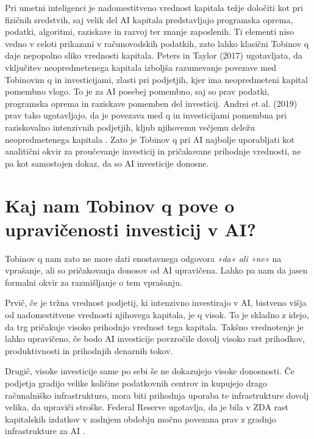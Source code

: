 \documentclass[12pt,a4paper]{article}
\begin{document}
Pri umetni inteligenci je nadomestitveno vrednost kapitala težje določiti kot pri fizičnih 
sredstvih, saj velik del AI kapitala predstavljajo programska oprema, podatki, algoritmi, 
raziskave in razvoj ter znanje zaposlenih. Ti elementi niso vedno v celoti prikazani v računovodskih 
podatkih, zato lahko klasični Tobinov q daje nepopolno sliko vrednosti kapitala.
Peters in Taylor (2017) ugotavljata, da vključitev neopredmetenega kapitala izboljša \citep{PetersTaylor2016} 
razumevanje povezave med Tobinovim q in investicijami, zlasti pri podjetjih, kjer ima 
neopredmeteni kapital pomembno vlogo. To je za AI posebej pomembno, saj so prav podatki, 
programska oprema in raziskave pomemben del investicij. Andrei et al. (2019) prav tako 
ugotavljajo, da je povezava med q in investicijami pomembna pri raziskovalno intenzivnih 
podjetjih, kljub njihovemu večjemu deležu neopredmetenega kapitala \citep{AndreiMannMoyen2017}.
Zato je Tobinov q pri AI najbolje uporabljati kot analitični okvir za proučevanje 
investicij in pričakovane prihodnje vrednosti, ne pa kot samostojen dokaz, da so AI 
investicije donosne.




\section{Kaj nam Tobinov q pove o upravičenosti investicij v AI?}




Tobinov q nam zato ne more dati enostavnega odgovora \textit{»da« ali »ne«} na vprašanje, 
ali so pričakovanja donosov od AI upravičena. Lahko pa nam da jasen formalni okvir za 
razmišljanje o tem vprašanju.

Prvič, če je tržna vrednost podjetij, ki intenzivno investirajo v AI, bistveno višja od 
nadomestitvene vrednosti njihovega kapitala, je q visok. To je skladno z idejo, da trg 
pričakuje visoko prihodnjo vrednost tega kapitala. Takšno vrednotenje je lahko upravičeno, 
če bodo AI investicije povzročile dovolj visoko rast prihodkov, produktivnosti in prihodnjih 
denarnih tokov.

Drugič, visoke investicije same po sebi še ne dokazujejo visoke donosnosti. Če podjetja 
gradijo velike količine podatkovnih centrov in kupujejo drago računalniško infrastrukturo, 
mora biti prihodnja uporaba te infrastrukture dovolj velika, da upraviči stroške. Federal 
Reserve ugotavlja, da je bila v ZDA rast kapitalskih izdatkov v zadnjem obdobju močno 
povezana prav z gradnjo infrastrukture za AI \citep{FederalReserve2026}.
\end{document}

